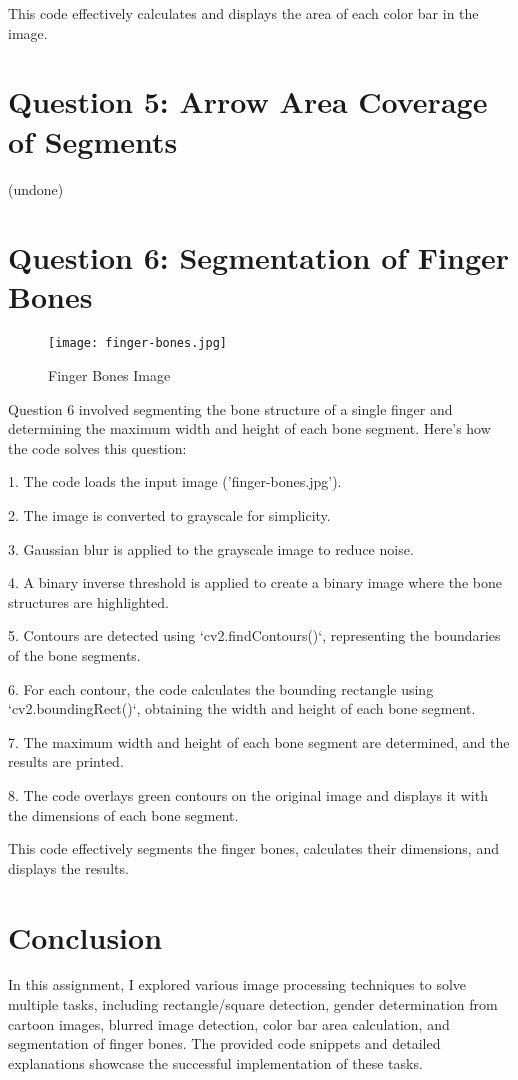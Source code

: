 \documentclass{article}
\begin{document}
This code effectively calculates and displays the area of each color bar in the image.

\section{Question 5: Arrow Area Coverage of Segments}

(undone)

\section{Question 6: Segmentation of Finger Bones}

\begin{figure}[ht]
    \centering
    \texttt{[image: finger-bones.jpg]}
    \caption{Finger Bones Image}
\end{figure}


Question 6 involved segmenting the bone structure of a single finger and determining the maximum width and height of each bone segment. Here's how the code solves this question:

1. The code loads the input image ('finger-bones.jpg').

2. The image is converted to grayscale for simplicity.

3. Gaussian blur is applied to the grayscale image to reduce noise.

4. A binary inverse threshold is applied to create a binary image where the bone structures are highlighted.

5. Contours are detected using `cv2.findContours()`, representing the boundaries of the bone segments.

6. For each contour, the code calculates the bounding rectangle using `cv2.boundingRect()`, obtaining the width and height of each bone segment.

7. The maximum width and height of each bone segment are determined, and the results are printed.

8. The code overlays green contours on the original image and displays it with the dimensions of each bone segment.

This code effectively segments the finger bones, calculates their dimensions, and displays the results.

\section{Conclusion}

In this assignment, I explored various image processing techniques to solve multiple tasks, including rectangle/square detection, gender determination from cartoon images, blurred image detection, color bar area calculation, and segmentation of finger bones. The provided code snippets and detailed explanations showcase the successful implementation of these tasks.
\end{document}

